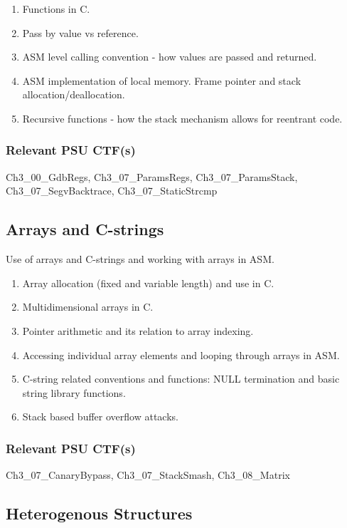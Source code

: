 \documentclass[12pt,letterpaper]{article}
\begin{document}
	\begin{enumerate}
		\item Functions in C.
		\item Pass by value vs reference.
		\item ASM level calling convention - how values are passed and returned.
		\item ASM implementation of local memory. Frame pointer and stack allocation/deallocation.
		\item Recursive functions - how the stack mechanism allows for reentrant code. 
	\end{enumerate}
	
	\subsubsection*{Relevant PSU CTF(s)}

	Ch3\_00\_GdbRegs, Ch3\_07\_ParamsRegs, Ch3\_07\_ParamsStack, Ch3\_07\_SegvBacktrace, Ch3\_07\_StaticStrcmp


	\subsection{Arrays and C-strings}

	Use of arrays and C-strings and working with arrays in ASM.

	\begin{enumerate}
		\item Array allocation (fixed and variable length) and use in C. 
		\item Multidimensional arrays in C.
		\item Pointer arithmetic and its relation to array indexing.
		\item Accessing individual array elements and looping through arrays in ASM.
		\item C-string related conventions and functions: NULL termination and basic string library functions.
		\item Stack based buffer overflow attacks.
	\end{enumerate}
	
	\subsubsection*{Relevant PSU CTF(s)}

	Ch3\_07\_CanaryBypass, Ch3\_07\_StackSmash, Ch3\_08\_Matrix


	\subsection{Heterogenous Structures}
\end{document}

